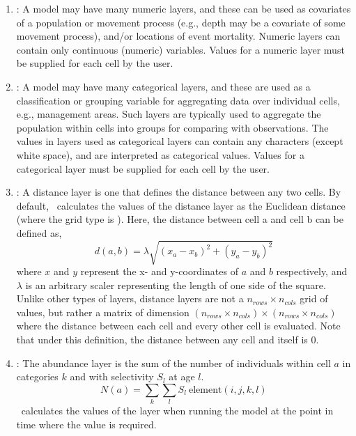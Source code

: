 \begin{enumerate}
\item{\label{numeric-layer}}: A model may have many numeric layers, and these can be used as covariates of a population or movement process (e.g., depth may be a covariate of some movement process), and/or locations of event mortality. Numeric layers can contain only continuous (numeric) variables. Values for a numeric layer must be supplied for each cell by the user.

\item {\label{categorical-layer}}: A model may have many categorical layers, and these are used as a classification or grouping variable for aggregating data over individual cells, e.g., management areas. Such layers are typically used to aggregate the population within cells into groups for comparing with observations. The values in layers used as categorical layers can contain any characters (except white space), and are interpreted as categorical values. Values for a categorical layer must be supplied for each cell by the user.

\item {}: A distance layer is one that defines the distance between any two cells. By default, \SPM\ calculates the values of the distance layer as the Euclidean distance (where the grid type is ). Here, the distance between cell a and cell b can be defined as,
\begin{equation}
  d(a,b) = \lambda \sqrt{(x_a - x_b)^2 + (y_a - y_b)^2}
\end{equation}
where $x$ and $y$ represent the x- and y-coordinates of $a$ and $b$ respectively, and $\lambda$ is an arbitrary scaler representing the length of one side of the square. Unlike other types of layers, distance layers are not a $n_{rows} \times n_{cols}$ grid of values, but rather a matrix of dimension $(n_{rows} \times n_{cols}) \times (n_{rows} \times n_{cols})$  where the distance between each cell and every other cell is evaluated. Note that under this definition, the distance between any cell and itself is 0. 

\item{}: The abundance layer is the sum of the number of individuals within cell $a$ in categories $k$ and with selectivity $S_l$ at age $l$. 
\begin{equation}
  N(a) = \sum\limits_{k} \sum\limits_l S_l \ \text{element}(i,j,k,l)
\end{equation}
\SPM\ calculates the values of the layer when running the model at the point in time where the value is required.


\end{enumerate}
